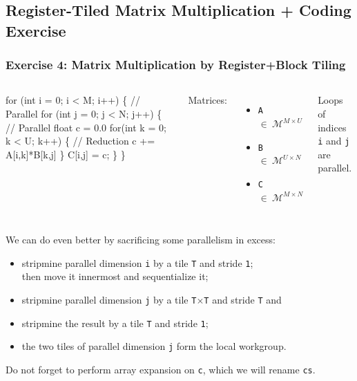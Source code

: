 \documentclass{beamer}
\newcommand{\emp}[1]{\textcolor{DikuRed}{ #1}}
\newcommand{\emphh}[1]{\textcolor{CosGreen}{ #1}}
\begin{document}
\subsection{Register-Tiled Matrix Multiplication + Coding Exercise}

\begin{frame}[fragile,t]
  \frametitle{Exercise 4: Matrix Multiplication by Register+Block Tiling}

\begin{columns}
\begin{colorcode}[fontsize=\scriptsize]
for (int i = 0; i < M; i++) \{  \emphh{// Parallel}
  for (int j = 0; j < N; j++) \{  \emphh{// Parallel}
    float c = 0.0
    for(int k = 0; k < U; k++) \{ \emp{// Reduction}
      c += A[i,k]*B[k,j] 
    \}
    C[i,j] = c;          
  \}
\}
\end{colorcode}
Matrices:
\begin{itemize}
    \item {\tt A $\in~\mathcal{M}^{M \times U}$}
    \item {\tt B $\in~\mathcal{M}^{U \times N}$}
    \item {\tt C$\in~\mathcal{M}^{M \times N}$} 
\end{itemize}
Loops of indices {\tt i} and {\tt j} are parallel.
\end{columns}

\bigskip

We can do even better by sacrificing some parallelism in excess:
\begin{itemize}
    \item stripmine parallel dimension {\tt i} by a tile {\tt T} and stride {\tt 1};\\
          then move it innermost and sequentialize it;
    \item stripmine parallel dimension {\tt j} by a tile {\tt T$\times$T} and stride {\tt T} and
    \item stripmine the result by a tile {\tt T} and stride {\tt 1};
    \item the two tiles of parallel dimension {\tt j} form the local workgroup.
\end{itemize}

Do not forget to perform array expansion on {\tt c}, which we will rename {\tt cs}.
\end{frame}
\end{document}
